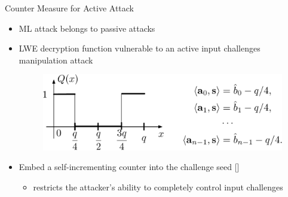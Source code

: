 \begin{frame}{Counter Measure for Active Attack}
\begin{itemize}
    \item ML attack belongs to passive attacks
    \item LWE decryption function vulnerable to an active input challenges manipulation attack
\begin{figure}
\centering
\includegraphics[width=.8\linewidth]{fig/ActiveAttack.pdf}
\end{figure}    
    \item Embed a self-incrementing counter into the challenge seed []
    \begin{itemize}
        \item  restricts the attacker’s ability to completely control input challenges
    \end{itemize}
\end{itemize}
\end{frame}

